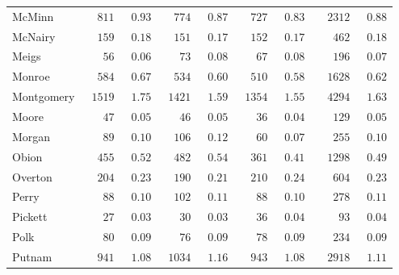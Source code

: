 \documentclass[9pt, oneside]{article}   	%
\begin{document}
\begin{longtable}{lcccccccc}
McMinn  & $\phantom{00}811$ & $\phantom{0}0.93$ & $\phantom{00}774$ & $\phantom{0}0.87$ & $\phantom{00}727$ & $\phantom{0}0.83$ & $\phantom{00}2312$ & $\phantom{0}0.88$ \\
McNairy  & $\phantom{00}159$ & $\phantom{0}0.18$ & $\phantom{00}151$ & $\phantom{0}0.17$ & $\phantom{00}152$ & $\phantom{0}0.17$ & $\phantom{000}462$ & $\phantom{0}0.18$ \\
Meigs  & $\phantom{000}56$ & $\phantom{0}0.06$ & $\phantom{000}73$ & $\phantom{0}0.08$ & $\phantom{000}67$ & $\phantom{0}0.08$ & $\phantom{000}196$ & $\phantom{0}0.07$ \\
Monroe  & $\phantom{00}584$ & $\phantom{0}0.67$ & $\phantom{00}534$ & $\phantom{0}0.60$ & $\phantom{00}510$ & $\phantom{0}0.58$ & $\phantom{00}1628$ & $\phantom{0}0.62$ \\
Montgomery  & $\phantom{0}1519$ & $\phantom{0}1.75$ & $\phantom{0}1421$ & $\phantom{0}1.59$ & $\phantom{0}1354$ & $\phantom{0}1.55$ & $\phantom{00}4294$ & $\phantom{0}1.63$ \\
Moore  & $\phantom{000}47$ & $\phantom{0}0.05$ & $\phantom{000}46$ & $\phantom{0}0.05$ & $\phantom{000}36$ & $\phantom{0}0.04$ & $\phantom{000}129$ & $\phantom{0}0.05$ \\
Morgan  & $\phantom{000}89$ & $\phantom{0}0.10$ & $\phantom{00}106$ & $\phantom{0}0.12$ & $\phantom{000}60$ & $\phantom{0}0.07$ & $\phantom{000}255$ & $\phantom{0}0.10$ \\
Obion  & $\phantom{00}455$ & $\phantom{0}0.52$ & $\phantom{00}482$ & $\phantom{0}0.54$ & $\phantom{00}361$ & $\phantom{0}0.41$ & $\phantom{00}1298$ & $\phantom{0}0.49$ \\
Overton  & $\phantom{00}204$ & $\phantom{0}0.23$ & $\phantom{00}190$ & $\phantom{0}0.21$ & $\phantom{00}210$ & $\phantom{0}0.24$ & $\phantom{000}604$ & $\phantom{0}0.23$ \\
Perry  & $\phantom{000}88$ & $\phantom{0}0.10$ & $\phantom{00}102$ & $\phantom{0}0.11$ & $\phantom{000}88$ & $\phantom{0}0.10$ & $\phantom{000}278$ & $\phantom{0}0.11$ \\
Pickett  & $\phantom{000}27$ & $\phantom{0}0.03$ & $\phantom{000}30$ & $\phantom{0}0.03$ & $\phantom{000}36$ & $\phantom{0}0.04$ & $\phantom{0000}93$ & $\phantom{0}0.04$ \\
Polk  & $\phantom{000}80$ & $\phantom{0}0.09$ & $\phantom{000}76$ & $\phantom{0}0.09$ & $\phantom{000}78$ & $\phantom{0}0.09$ & $\phantom{000}234$ & $\phantom{0}0.09$ \\
Putnam  & $\phantom{00}941$ & $\phantom{0}1.08$ & $\phantom{0}1034$ & $\phantom{0}1.16$ & $\phantom{00}943$ & $\phantom{0}1.08$ & $\phantom{00}2918$ & $\phantom{0}1.11$ \\

\end{longtable}
\end{document}
